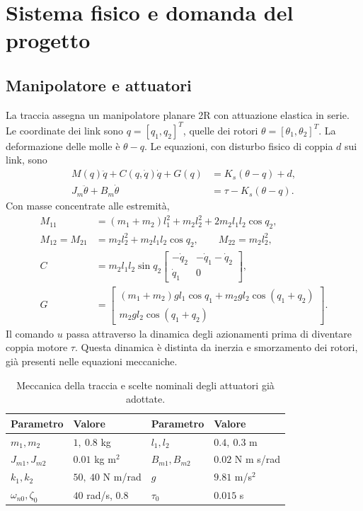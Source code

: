 \chapter{Sistema fisico e domanda del progetto}
\section{Manipolatore e attuatori}
La traccia assegna un manipolatore planare 2R con attuazione elastica in
serie. Le coordinate dei link sono $q=[q_1,q_2]^T$, quelle dei rotori
$\theta=[\theta_1,\theta_2]^T$. La deformazione delle molle è $\theta-q$.
Le equazioni, con disturbo fisico di coppia $d$ sui link, sono
\begin{align}
M(q)\ddot q+C(q,\dot q)\dot q+G(q)&=K_s(\theta-q)+d,\\
J_m\ddot\theta+B_m\dot\theta&=\tau-K_s(\theta-q).
\end{align}
Con masse concentrate alle estremità,
\begin{align*}
M_{11}&=(m_1+m_2)l_1^2+m_2l_2^2+2m_2l_1l_2\cos q_2,\\
M_{12}=M_{21}&=m_2l_2^2+m_2l_1l_2\cos q_2,\qquad M_{22}=m_2l_2^2,\\
C&=m_2l_1l_2\sin q_2\begin{bmatrix}-\dot q_2&-\dot q_1-\dot q_2\\\dot q_1&0\end{bmatrix},\\
G&=\begin{bmatrix}(m_1+m_2)gl_1\cos q_1+m_2gl_2\cos(q_1+q_2)\\m_2gl_2\cos(q_1+q_2)\end{bmatrix}.
\end{align*}
Il comando $u$ passa attraverso la dinamica degli azionamenti prima di
diventare coppia motore $\tau$. Questa dinamica è distinta da inerzia e
smorzamento dei rotori, già presenti nelle equazioni meccaniche.
\begin{table}[htbp]\centering
\begin{tabular}{llll}\toprule
Parametro&Valore&Parametro&Valore\\\midrule
$m_1,m_2$&$1,\ 0.8$ kg&$l_1,l_2$&$0.4,\ 0.3$ m\\
$J_{m1},J_{m2}$&$0.01$ kg m$^2$&$B_{m1},B_{m2}$&$0.02$ N m s/rad\\
$k_1,k_2$&$50,\ 40$ N m/rad&$g$&$9.81$ m/s$^2$\\
$\omega_{n0},\zeta_0$&$40$ rad/s, $0.8$&$\tau_0$&$0.015$ s\\\bottomrule
\end{tabular}
\caption{Meccanica della traccia e scelte nominali degli attuatori già adottate.}
\end{table}
